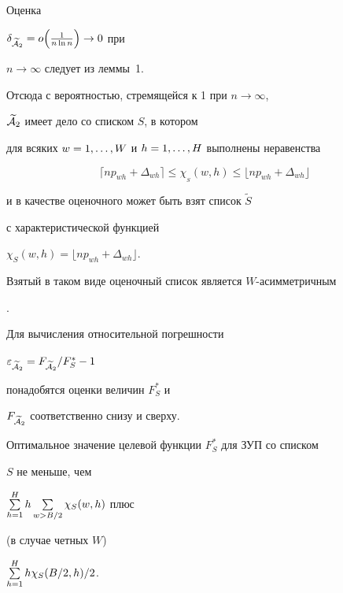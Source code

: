 \begin{pf}


Оценка 


$\delta_{\widetilde{\cal A}_{2}}=


o\Bigl(\frac {1}{n \ln n}\Bigr) \to 0$ при 


$n \to \infty $ следует из леммы~1.


Отсюда с вероятностью, стремящейся к 1 при $n \to \infty $, 


$ \widetilde {\cal A}_{2}$ имеет дело со списком $S$, в котором 


для всяких $w=1,\dotsc,W$ и $h=1,\dotsc,H$ выполнены неравенства 


\begin{equation}


\label{e3}


\lceil np_{wh} + \Delta_{wh} \rceil \le


\chi_{_{\scriptstyle S}}(w,h) \le


\lfloor np_{wh} + \Delta_{wh} \rfloor 


\end{equation}


и в качестве оценочного может быть взят список $\widetilde S$


с характеристической функцией


$\chi_S(w,h) =\lfloor np_{wh} + \Delta_{wh} \rfloor$. 


Взятый в таком виде оценочный список является $W$-асимметричным


\cite{GZ}.





Для вычисления относительной погрешности 


$\eps_{\widetilde{\cal A}_{2}}=


F_{\widetilde{\cal A}_{2}}/F_{S}^{*}-1$


понадобятся оценки величин $F_{S}^{*}$ и 


$F_{\widetilde{\cal A}_{2}}$ соответственно снизу и сверху.





Оптимальное значение целевой функции $F_{S}^{*}$ для ЗУП со списком


$S$ не меньше, чем \linebreak


$\sum\limits^H_{h=1} h\sum\limits_{w>B/2}\chi_S(w,h)$ плюс 


(в случае четных $W$) 


$\sum\limits^H_{h=1} h \chi_S(B/2,h)/2$.



\end{pf}
